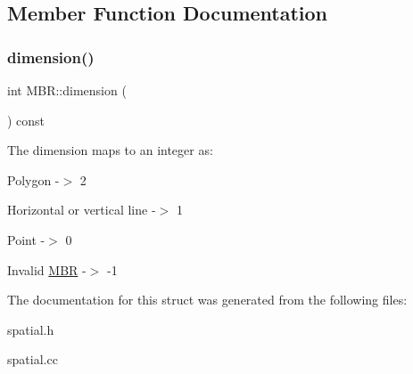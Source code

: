 \subsection{Member Function Documentation}
\mbox{\label{structMBR_a26ccb0cfb2eeffbcec91b2640f234374}} 
\subsubsection{\texorpdfstring{dimension()}{dimension()}}
{\footnotesize\ttfamily int M\+B\+R\+::dimension (\begin{DoxyParamCaption}{ }\end{DoxyParamCaption}) const\hspace{0.3cm}{\ttfamily [inline]}}

The dimension maps to an integer as\+:
\begin{DoxyItemize}
\item Polygon -\/$>$ 2
\item Horizontal or vertical line -\/$>$ 1
\item Point -\/$>$ 0
\item Invalid \mbox{\hyperlink{structMBR}{M\+BR}} -\/$>$ -\/1 
\end{DoxyItemize}

The documentation for this struct was generated from the following files\+:\begin{DoxyCompactItemize}
\item 
spatial.\+h\item 
spatial.\+cc\end{DoxyCompactItemize}
